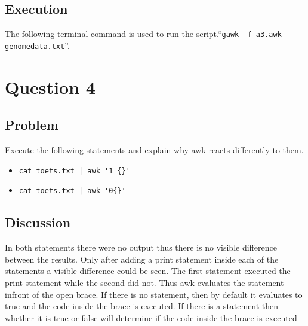 \documentclass[a4paper, 10pt]{article}
\begin{document}
\subsection*{Execution}The following terminal command is used to run the script.``\verb#gawk -f a3.awk genomedata.txt#''.
\section*{Question 4}
\subsection*{Problem}Execute the following statements and explain why awk reacts differently to them.
\begin{itemize}
\item \verb#cat toets.txt | awk '1 {}'#
\item \verb#cat toets.txt | awk '0{}'#
\end{itemize}
\subsection*{Discussion}In both statements there were no output thus there is no visible difference between the results. Only after adding a print statement inside each of the statements a visible difference could be seen. The first statement executed the print statement while the second did not. Thus awk evaluates the statement infront of the open brace. If there is no statement, then by default it evaluates to true and the code inside the brace is executed. If there is a statement then whether it is true or false will determine if the code inside the brace is executed
\end{document}
